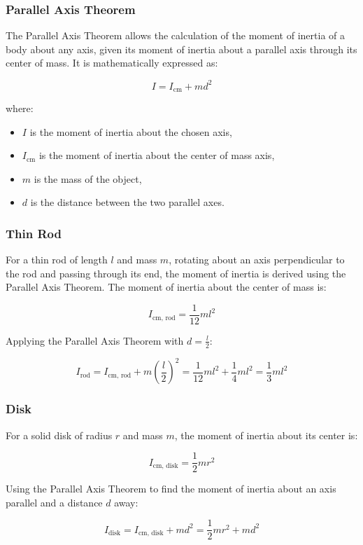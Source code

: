 \subsubsection{Parallel Axis Theorem}
The Parallel Axis Theorem allows the calculation of the moment of inertia of a body about any axis, given its moment of inertia about a parallel axis through its center of mass. It is mathematically expressed as:

\begin{equation}
\label{eq:parallel_axis_theorem}
I = I_{\text{cm}} + md^2
\end{equation}

where:
\begin{itemize}
    \item \(I\) is the moment of inertia about the chosen axis,
    \item \(I_{\text{cm}}\) is the moment of inertia about the center of mass axis,
    \item \(m\) is the mass of the object,
    \item \(d\) is the distance between the two parallel axes.
\end{itemize}

\subsubsection{Thin Rod}
For a thin rod of length \(l\) and mass \(m\), rotating about an axis perpendicular to the rod and passing through its end, the moment of inertia is derived using the Parallel Axis Theorem. The moment of inertia about the center of mass is:

\begin{equation}
\label{eq:rod_cm_inertia}
I_{\text{cm, rod}} = \frac{1}{12}ml^2
\end{equation}

Applying the Parallel Axis Theorem with \(d = \frac{l}{2}\):

\begin{equation}
\label{eq:rod_total_inertia}
I_{\text{rod}} = I_{\text{cm, rod}} + m\left(\frac{l}{2}\right)^2 = \frac{1}{12}ml^2 + \frac{1}{4}ml^2 = \frac{1}{3}ml^2
\end{equation}

\subsubsection{Disk}
For a solid disk of radius \(r\) and mass \(m\), the moment of inertia about its center is:

\begin{equation}
\label{eq:disk_cm_inertia}
I_{\text{cm, disk}} = \frac{1}{2}mr^2
\end{equation}

Using the Parallel Axis Theorem to find the moment of inertia about an axis parallel and a distance \(d\) away:

\begin{equation}
\label{eq:disk_total_inertia}
I_{\text{disk}} = I_{\text{cm, disk}} + md^2 = \frac{1}{2}mr^2 + md^2
\end{equation}




